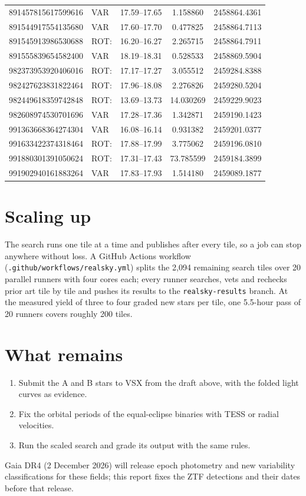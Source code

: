 \documentclass[11pt]{article}
\begin{document}
{\begin{longtable}{rlccc}
891457815617599616 & VAR & 17.59--17.65 & 1.158860 & 2458864.4361 \\
891544917554135680 & VAR & 17.60--17.70 & 0.477825 & 2458864.7113 \\
891545913986530688 & ROT: & 16.20--16.27 & 2.265715 & 2458864.7911 \\
891555839654582400 & VAR & 18.19--18.31 & 0.528533 & 2458869.5904 \\
982373953920406016 & ROT: & 17.17--17.27 & 3.055512 & 2459284.8388 \\
982427623831822464 & ROT: & 17.96--18.08 & 2.276826 & 2459280.5204 \\
982449618359742848 & ROT: & 13.69--13.73 & 14.030269 & 2459229.9023 \\
982608974530701696 & VAR & 17.28--17.36 & 1.342871 & 2459190.1423 \\
991363668364274304 & VAR & 16.08--16.14 & 0.931382 & 2459201.0377 \\
991633422374318464 & ROT: & 17.88--17.99 & 3.775062 & 2459196.0810 \\
991880301391050624 & ROT: & 17.31--17.43 & 73.785599 & 2459184.3899 \\
991902940161883264 & VAR & 17.83--17.93 & 1.514180 & 2459089.1877 \\
\bottomrule\end{longtable}}

\section{Scaling up}
The search runs one tile at a time and publishes after every tile, so a job can stop anywhere without loss. A GitHub Actions workflow (\texttt{.github/workflows/realsky.yml}) splits the 2{,}094 remaining search tiles over 20 parallel runners with four cores each; every runner searches, vets and rechecks prior art tile by tile and pushes its results to the \texttt{realsky-results} branch. At the measured yield of three to four graded new stars per tile, one 5.5-hour pass of 20 runners covers roughly 200 tiles.

\section{What remains}
\begin{enumerate}
\item Submit the A and B stars to VSX from the draft above, with the folded light curves as evidence.
\item Fix the orbital periods of the equal-eclipse binaries with TESS or radial velocities.
\item Run the scaled search and grade its output with the same rules.
\end{enumerate}
Gaia DR4 (2 December 2026) will release epoch photometry and new variability classifications for these fields; this report fixes the ZTF detections and their dates before that release.
\end{document}
